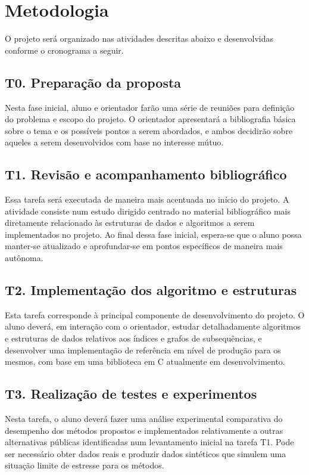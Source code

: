 \documentclass[12pt, a4paper, oneside]{article}
\begin{document}
\clearpage
\section{Metodologia}

O projeto será organizado nas atividades descritas abaixo e desenvolvidas conforme o cronograma a seguir.

\subsection*{T0. Preparação da proposta}

Nesta fase inicial, aluno e orientador farão uma série de reuniões para definição do problema e escopo do projeto. O orientador apresentará a bibliografia básica sobre o tema e os possíveis pontos a serem abordados, e ambos decidirão sobre aqueles a serem desenvolvidos com base no  interesse mútuo.

\subsection*{T1. Revisão e acompanhamento bibliográfico}

Essa tarefa será executada de maneira mais acentuada no início do projeto. A atividade consiste num estudo dirigido centrado no  material bibliográfico mais diretamente relacionado às estruturas de dados e algoritmos a serem implementados no projeto. Ao final dessa fase inicial, espera-se que o aluno possa manter-se atualizado e aprofundar-se em pontos específicos de maneira mais autônoma.


\subsection*{T2. Implementação dos algoritmo e estruturas}

Esta tarefa corresponde à principal componente de desenvolvimento do projeto. O aluno deverá, em interação com o orientador, estudar detalhadamente algoritmos e estruturas de dados relativos aos índices e grafos de subsequências, e desenvolver uma implementação de referência em nível de produção para os mesmos, com base em uma biblioteca em C atualmente em desenvolvimento.


\subsection*{T3. Realização de testes e experimentos}

Nesta tarefa, o aluno deverá fazer uma análise experimental comparativa do desempenho dos métodos propostos e implementados relativamente a outras alternativas públicas identificadas num levantamento inicial na tarefa T1. Pode ser necessário obter dados reais e produzir dados sintéticos que simulem uma situação limite de estresse para os métodos.
\end{document}
